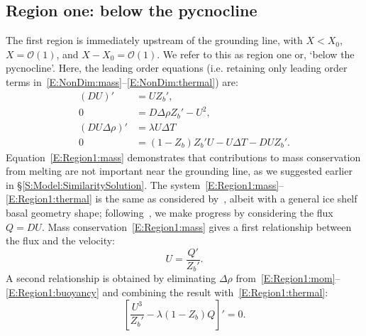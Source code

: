 \documentclass{jfm}
\newcommand{\dd}[2]{\frac{\mathrm{d} #1}{\mathrm{d} #2}}
\newcommand{\order}[1]{\mathcal{O}(#1)}
\begin{document}
\subsection{Region one: below the pycnocline}\label{S:Asymptotics:Region1}
The first region is immediately upstream of the grounding line,  with $X  <  X_0$,  $X= \order{1}$, and $X - X_0 = \mathcal{O}(1)$. We refer to this as region one or, `below the pycnocline'. Here, the leading order equations (i.e. retaining only leading order terms in~\eqref{E:NonDim:mass}--\eqref{E:NonDim:thermal}) are:
\begin{align}
(DU)' &= U Z_b',\label{E:Region1:mass}\\
0 &= D \Delta \rho Z_b' - U^2, \label{E:Region1:mom}\\
(DU\Delta \rho)'  &=\lambda U \Delta T\label{E:Region1:buoyancy}\\
0&= (1  - Z_b)Z_b' U- U\Delta T - DU Z_b'.\label{E:Region1:thermal}
\end{align}
Equation~\eqref{E:Region1:mass} demonstrates that contributions to mass conservation from melting are not important near the grounding line, as we suggested earlier in \S\ref{S:Model:SimilaritySolution}. 
The system~\eqref{E:Region1:mass}--\eqref{E:Region1:thermal} is the same as considered by~\cite{Lazeroms2019JPhysOcean}, albeit with a general ice shelf basal geometry shape; following~\cite{Lazeroms2019JPhysOcean}, we make progress by considering the flux $Q= DU$. Mass conservation~\eqref{E:Region1:mass} gives a first relationship between the flux and the velocity:
\begin{equation}\label{E:Region1:U_Q_relation1}
U = \frac{Q'}{Z_b'}.
\end{equation}
A second relationship is obtained by eliminating $\Delta \rho$ from~\eqref{E:Region1:mom}--\eqref{E:Region1:buoyancy} and combining the result with~\eqref{E:Region1:thermal}:
\begin{equation}\label{E:Region1:U_Q_relation2}
\left[\frac{U^3}{Z_b'} - \lambda (1 - Z_b)Q\right]' = 0.
\end{equation}
\end{document}
